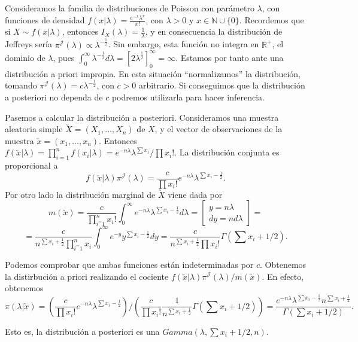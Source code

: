 \begin{ex} \label{ex:jeff:poisson}

	Consideramos la familia de distribuciones de Poisson con parámetro $\lambda$, con funciones de densidad $f(x|\lambda) = \frac{e^{-\lambda} \lambda ^{x}}{x!}$, con $\lambda > 0$ y $x\in\mathbb{N}\cup\{0\}$. Recordemos que si $X \sim f(x|\lambda)$, entonces $I_X(\lambda) = \frac{1}{\lambda}$, y en consecuencia la distribución de Jeffreys sería $\pi^{\mathcal{J}}(\lambda) \propto \lambda^{-\frac{1}{2}}$. Sin embargo, esta función no integra en $\mathbb{R}^{+}$, el dominio de $\lambda$, pues $\int_{0}^{\infty}{\lambda^{-\frac{1}{2}}d\lambda} = [2\lambda^{\frac{1}{2}}]_{0}^{\infty} = \infty$. Estamos por tanto ante una distribución a priori impropia. En esta situación ``normalizamos'' la distribución, tomando $\pi^{\mathcal{J}}(\lambda) = c\lambda^{-\frac{1}{2}}$, con $c > 0$ arbitrario. Si conseguimos que la distribución a posteriori no dependa de $c$ podremos utilizarla para hacer inferencia.

	Pasemos a calcular la distribución a posteriori. Consideramos una muestra aleatoria simple $\utilde{X} = (X_1,\ldots,X_n)$ de $X$, y el vector de observaciones de la muestra $\utilde{x}=(x_1,\ldots,x_n)$. Entonces $f(\utilde{x}|\lambda)=\prod_{i=1}^{n}{f(x_i|\lambda)}=e^{-n\lambda}\lambda^{\sum{x_i}} / \prod{x_i!}$. La distribución conjunta es proporcional a
	\[f(\utilde{x}|\lambda)\pi^{\mathcal{J}}(\lambda) = \frac{c}{\prod{x_i!}}e^{-n\lambda}\lambda^{\sum{x_i}-\frac{1}{2}}.\]
	Por otro lado la distribución marginal de $\utilde{X}$ viene dada por
	\[m(\utilde{x}) = \frac{c}{\prod_{i^=1}^{n}{x_i!}} \int_{0}^{\infty} {e^{-n\lambda} \lambda^{\sum{x_i} - \frac{1}{2}} d\lambda} =  \left[\begin{array}{ll} y = n \lambda \\ dy = nd\lambda \end{array} \right]  =\]
	\[ = \frac{c}{n ^{\sum{x_i} + \frac{1}{2}}\prod_{i^=1}^{n}{x_i}} \int_{0}^{\infty} {e^{-y} y^{\sum{x_i}-\frac{1}{2} } dy } = \frac{c}{n ^{\sum{x_i} + \frac{1}{2}}\prod{x_i!}}\Gamma(\sum{x_i} + 1/2).\]

	Podemos comprobar que ambas funciones están indeterminadas por $c$. Obtenemos la distirbución a priori realizando el cociente $f(\utilde{x}|\lambda)\pi^{\mathcal{J}}(\lambda) / m(\utilde{x})$. En efecto, obtenemos
	\[\pi(\lambda|\utilde{x}) = \left( \frac{c}{\prod{x_i!}}e^{-n\lambda}\lambda^{\sum{x_i}-\frac{1}{2}}\right) / \left(\frac{c}{\prod{x_i!}} \frac{1}{n ^{\sum{x_i} + \frac{1}{2}}}\Gamma(\sum{x_i} + 1/2) \right) = \frac{e^{-n\lambda} \lambda^{\sum{x_i} - \frac{1}{2}} n^{\sum{x_i} + \frac{1}{2}}}{\Gamma(\sum{x_i} + 1/2)}. \]

    Esto es, la distribución a posteriori es una $Gamma(\lambda, \sum x_i + 1/2, n)$.
\end{ex}

